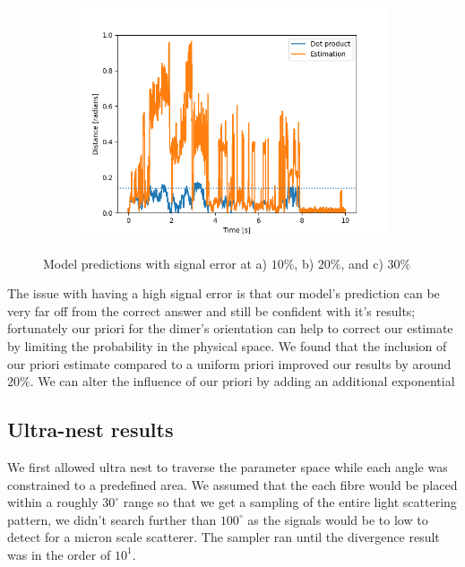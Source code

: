 \documentclass[review,3p]{elsarticle}
\begin{document}
\begin{figure}
\begin{subfigure}{0.33\textwidth}
	\end{subfigure}
	\begin{subfigure}{0.33\textwidth}
		\includegraphics[width=\textwidth]{Error_30_percent.png}
	\end{subfigure}
	\caption{Model predictions with signal error at a) $10 \%$, b)  $20\%$, and c) $30\%$}
\end{figure}

The issue with having a high signal error is that our model's prediction can be very far off from the correct answer and still be confident with it's results; fortunately our priori for the dimer's orientation can help to correct our estimate by limiting the probability in the physical space. We found that the inclusion of our priori estimate compared to a uniform priori improved our results by around $20 \%$. We can alter the influence of our priori by adding an additional exponential 

\subsection{Ultra-nest results}
\label{3.3}
We first allowed ultra nest to traverse the parameter space while each angle was constrained to a predefined area. We assumed that the each fibre would be placed within a roughly $30^{\circ}$ range so that we get a sampling of the entire light scattering pattern, we didn't search further than $100^{\circ}$ as the signals would be to low to detect for a micron scale scatterer. The sampler ran until the divergence result was in the order of $10^1$.
\end{document}
